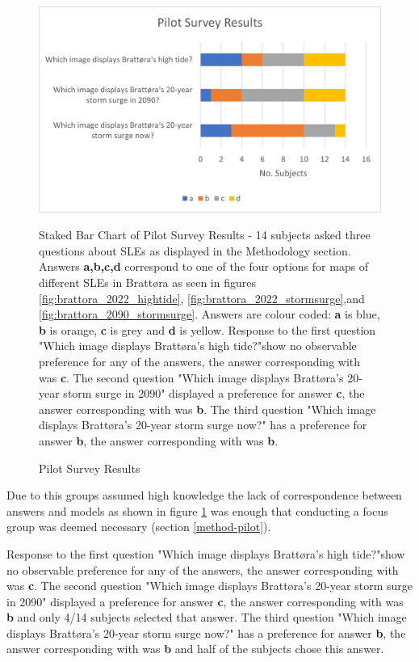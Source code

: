 \begin{figure}[H]
    \centering
    \includegraphics{fig_results/pilot_survey_results.png}
    \caption{Pilot Survey Results}{Staked Bar Chart of Pilot Survey Results - 14 subjects asked three questions about SLEs as displayed in the Methodology section. Answers \textbf{a,b,c,d} correspond to one of the four options for maps of different SLEs in Brattøra as seen in figures \ref{fig:brattora_2022_hightide}, \ref{fig:brattora_2022_stormsurge},and  \ref{fig:brattora_2090_stormsurge}. Answers are colour coded: \textbf{a} is blue, \textbf{b} is orange, \textbf{c} is grey and \textbf{d} is yellow. Response to the first question "Which image displays Brattøra's high tide?"show no observable preference for any of the answers, the answer corresponding with \cite{kartverket_se_2021} was \textbf{c}. The second question "Which image displays Brattøra's 20-year storm surge in 2090" displayed a preference for answer \textbf{c}, the answer corresponding with \cite{kartverket_se_2021} was \textbf{b}. The third question "Which image displays Brattøra's 20-year storm surge now?" has a preference for answer \textbf{b}, the answer corresponding with \cite{kartverket_se_2021} was \textbf{b}.}
    \label{fig:pilot_survey_results}
\end{figure}

Due to this groups assumed high knowledge the lack of correspondence between answers and models as shown in figure \ref{fig:pilot_survey_results} was enough that conducting a focus group was deemed necessary (section \ref{method-pilot}).

Response to the first question "Which image displays Brattøra's high tide?"show no observable preference for any of the answers, the answer corresponding with \cite{kartverket_se_2021} was \textbf{c}. The second question "Which image displays Brattøra's 20-year storm surge in 2090" displayed a preference for answer \textbf{c}, the answer corresponding with \cite{kartverket_se_2021} was \textbf{b} and only 4/14 subjects selected that answer. The third question "Which image displays Brattøra's 20-year storm surge now?" has a preference for answer \textbf{b}, the answer corresponding with \cite{kartverket_se_2021} was \textbf{b} and half of the subjects chose this answer.


